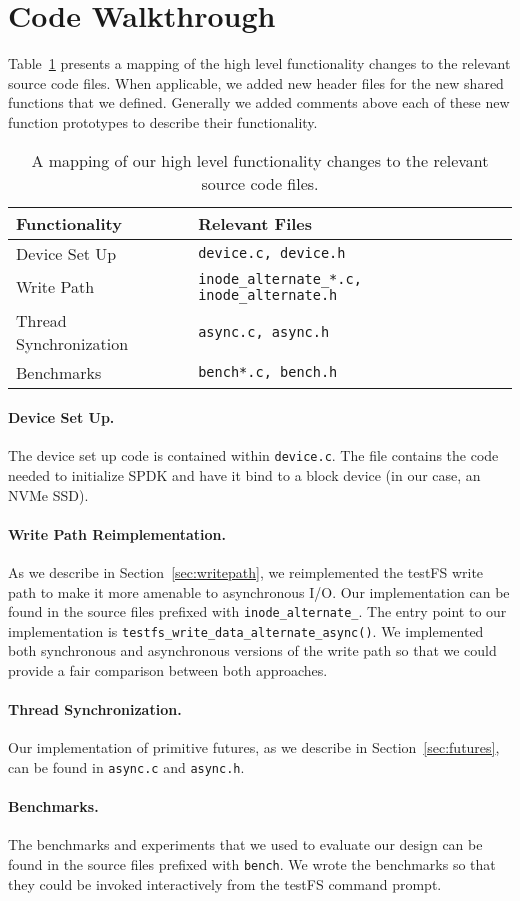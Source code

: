 \section{Code Walkthrough}\label{apx:codewalkthrough}
Table~\ref{tbl:codemap} presents a mapping of the high level functionality
changes to the relevant source code files. When applicable, we added new header
files for the new shared functions that we defined. Generally we added comments
above each of these new function prototypes to describe their functionality.

\begin{table}[h!]
  \centering
  \caption{A mapping of our high level functionality changes to the relevant
    source code files.}\label{tbl:codemap}
  \begin{tabular}{p{2cm}|p{4cm}}
    {\bf Functionality} & {\bf Relevant Files} \\ \hline
    Device Set Up & {\tt device.c, device.h} \\ \hline
    Write Path & {\tt inode\_alternate\_*.c, inode\_alternate.h} \\ \hline
    Thread Synchronization & {\tt async.c, async.h} \\ \hline
    Benchmarks & {\tt bench*.c, bench.h}
  \end{tabular}
\end{table}

\paragraph{Device Set Up.}
The device set up code is contained within {\tt device.c}. The file contains
the code needed to initialize SPDK and have it bind to a block device (in our
case, an NVMe SSD).

\paragraph{Write Path Reimplementation.}
As we describe in Section~\ref{sec:writepath}, we reimplemented the testFS
write path to make it more amenable to asynchronous I/O. Our implementation can
be found in the source files prefixed with {\tt inode\_alternate\_}. The entry
point to our implementation is {\tt testfs\_write\_data\_alternate\_async()}.
We implemented both synchronous and asynchronous versions of the write path so
that we could provide a fair comparison between both approaches.

\paragraph{Thread Synchronization.}
Our implementation of primitive futures, as we describe in
Section~\ref{sec:futures}, can be found in {\tt async.c} and {\tt async.h}.

\paragraph{Benchmarks.}
The benchmarks and experiments that we used to evaluate our design can be found
in the source files prefixed with {\tt bench}. We wrote the benchmarks so that
they could be invoked interactively from the testFS command prompt.
